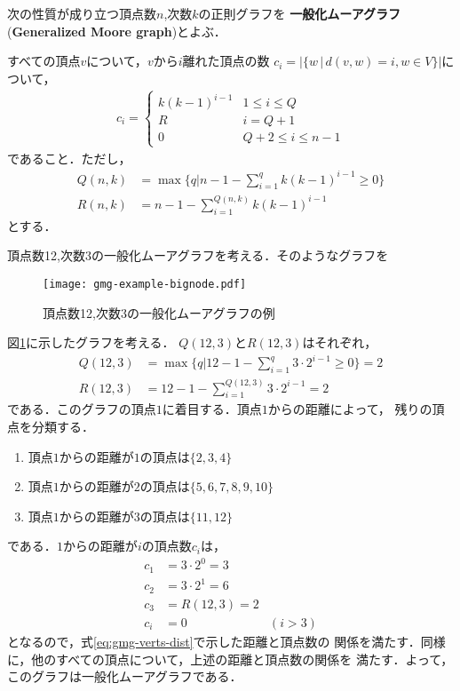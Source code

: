 \begin{definition}
  \label{def:generalized-moore-graph}
  次の性質が成り立つ頂点数$n$,次数$k$の正則グラフを
  \textbf{一般化ムーアグラフ}(\textbf{Generalized Moore graph})とよぶ．

  すべての頂点$v$について，$v$から$i$離れた頂点の数
  $c_i = \lvert\{ w\,|\,d(v,w) = i , w\in V \}\rvert$について，
  \begin{equation}
    \label{eq:gmg-verts-dist}
    \begin{aligned}
      c_i =
      \begin{cases}
        k(k-1)^{i-1} & 1\leq i\leq Q \\
        R & i = Q+1 \\
        0 & Q+2\leq i \leq n-1
      \end{cases}
    \end{aligned}
  \end{equation}
  であること．ただし，
  \begin{align}
    Q(n,k) &= \max\{q | n-1-\sum_{i=1}^{q}k(k-1)^{i-1} \geq 0\}
    \label{eq:gmg-q} \\
    R(n,k) &= n - 1 - \sum_{i=1}^{Q(n,k)}k(k-1)^{i-1}
    \label{eq:gmg-r}
  \end{align}
  とする．
\end{definition}
\begin{example}
  頂点数12,次数3の一般化ムーアグラフを考える．そのようなグラフを
  \begin{figure}
    \centering
    \texttt{[image: gmg-example-bignode.pdf]}
    \caption{頂点数12,次数3の一般化ムーアグラフの例}
    \label{fig:moore-graph-example}
  \end{figure}
  図\ref{fig:moore-graph-example}に示したグラフを考える．
  $Q(12,3)$と$R(12,3)$はそれぞれ，
  \begin{align*}
    Q(12,3) &= \max\{q | 12-1-\sum_{i=1}^{q}3\cdot2^{i-1} \geq 0\} = 2 \\
    R(12,3) &= 12 - 1 - \sum_{i=1}^{Q(12,3)}3\cdot2^{i-1} = 2
  \end{align*}
  である．このグラフの頂点$1$に着目する．頂点$1$からの距離によって，
  残りの頂点を分類する．
  \begin{enumerate}
  \item 頂点$1$からの距離が$1$の頂点は$\{2,3,4\}$
  \item 頂点$1$からの距離が$2$の頂点は$\{5,6,7,8,9,10\}$
  \item 頂点$1$からの距離が$3$の頂点は$\{11,12\}$
  \end{enumerate}
  である．$1$からの距離が$i$の頂点数$c_i$は，
  \begin{align*}
  c_1 &= 3\cdot2^0 = 3 & \\
  c_2 &= 3\cdot2^1 = 6 & \\
  c_3 &= R(12,3) = 2 & \\
  c_i &= 0 & (i>3)
  \end{align*}
  となるので，式\ref{eq:gmg-verts-dist}で示した距離と頂点数の
  関係を満たす．同様に，他のすべての頂点について，上述の距離と頂点数の関係を
  満たす．よって，このグラフは一般化ムーアグラフである．
\end{example}
